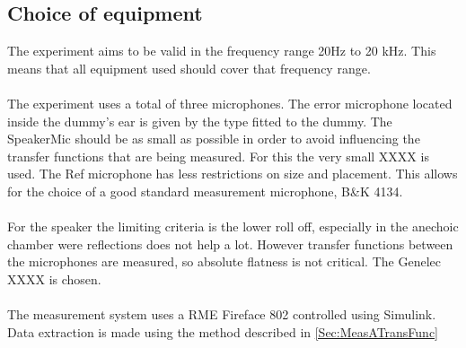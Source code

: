 \subsection{Choice of equipment}
The experiment aims to be valid in the frequency range 20Hz to 20 kHz. This means that all equipment used should cover that frequency range. \\\\
The experiment uses a total of three microphones. The error microphone located inside the dummy's ear is given by the type fitted to the dummy. The SpeakerMic should be as small as possible in order to avoid influencing the transfer functions that are being measured. For this the very small XXXX is used. The Ref microphone has less restrictions on size and placement. This allows for the choice of a good standard measurement microphone, B\&K 4134. \\\\
For the speaker the limiting criteria is the lower roll off, especially in the anechoic chamber were reflections does not help a lot. However transfer functions between the microphones are measured, so absolute flatness is not critical. The Genelec XXXX is chosen. \\\\
The measurement system uses a RME Fireface 802 controlled using Simulink. Data extraction is made using the method described in \autoref{Sec:MeasATransFunc}

